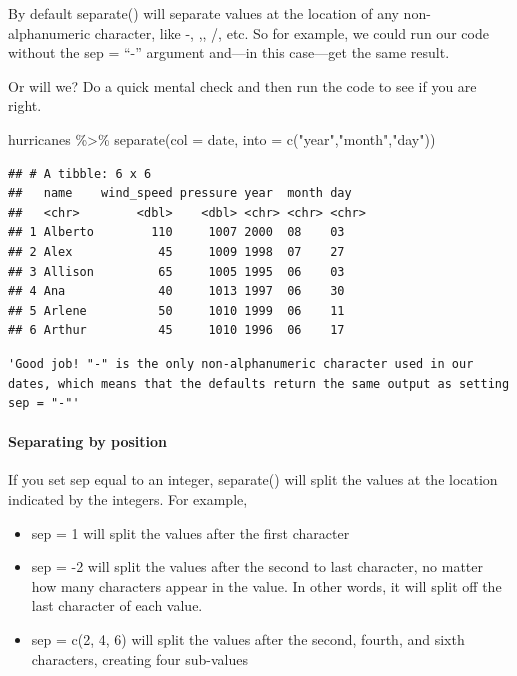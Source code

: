 \documentclass[
]{article}
\newenvironment{Shaded}{\begin{snugshade}}{\end{snugshade}}
\newcommand{\AttributeTok}[1]{\textcolor[rgb]{0.77,0.63,0.00}{#1}}
\newcommand{\FunctionTok}[1]{\textcolor[rgb]{0.00,0.00,0.00}{#1}}
\newcommand{\NormalTok}[1]{#1}
\newcommand{\SpecialCharTok}[1]{\textcolor[rgb]{0.00,0.00,0.00}{#1}}
\newcommand{\StringTok}[1]{\textcolor[rgb]{0.31,0.60,0.02}{#1}}
\providecommand{\tightlist}{%
  \setlength{\itemsep}{0pt}\setlength{\parskip}{0pt}}
\begin{document}
By default separate() will separate values at the location of any
non-alphanumeric character, like -, ,, /, etc. So for example, we could
run our code without the sep = ``-'' argument and---in this case---get
the same result.

Or will we? Do a quick mental check and then run the code to see if you
are right.

\begin{Shaded}
\begin{Highlighting}[]
\NormalTok{hurricanes }\SpecialCharTok{\%\textgreater{}\%} 
  \FunctionTok{separate}\NormalTok{(}\AttributeTok{col =}\NormalTok{ date, }\AttributeTok{into =} \FunctionTok{c}\NormalTok{(}\StringTok{"year"}\NormalTok{,}\StringTok{"month"}\NormalTok{,}\StringTok{"day"}\NormalTok{))}
\end{Highlighting}
\end{Shaded}

\begin{verbatim}
## # A tibble: 6 x 6
##   name    wind_speed pressure year  month day  
##   <chr>        <dbl>    <dbl> <chr> <chr> <chr>
## 1 Alberto        110     1007 2000  08    03   
## 2 Alex            45     1009 1998  07    27   
## 3 Allison         65     1005 1995  06    03   
## 4 Ana             40     1013 1997  06    30   
## 5 Arlene          50     1010 1999  06    11   
## 6 Arthur          45     1010 1996  06    17
\end{verbatim}

\begin{verbatim}
'Good job! "-" is the only non-alphanumeric character used in our dates, which means that the defaults return the same output as setting sep = "-"'
\end{verbatim}

\hypertarget{separating-by-position}{%
\paragraph{Separating by position}\label{separating-by-position}}

If you set sep equal to an integer, separate() will split the values at
the location indicated by the integers. For example,

\begin{itemize}
\tightlist
\item
  sep = 1 will split the values after the first character
\item
  sep = -2 will split the values after the second to last character, no
  matter how many characters appear in the value. In other words, it
  will split off the last character of each value.
\item
  sep = c(2, 4, 6) will split the values after the second, fourth, and
  sixth characters, creating four sub-values
\end{itemize}
\end{document}
